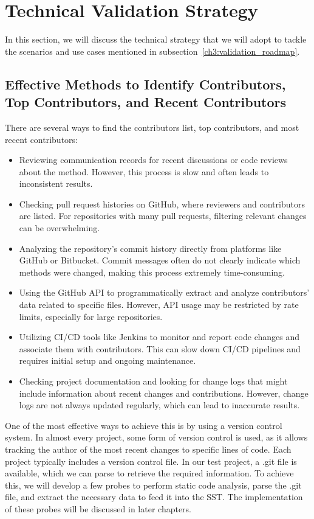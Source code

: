 \section{Technical Validation Strategy}

In this section, we will discuss the technical strategy that we will adopt to tackle the scenarios and use cases mentioned in subsection~\ref{ch3:validation_roadmap}.

\subsection{Effective Methods to Identify Contributors, Top Contributors, and Recent Contributors}

There are several ways to find the contributors list, top contributors, and most recent contributors:
\begin{itemize}
    \item Reviewing communication records for recent discussions or code reviews about the method. However, this process is slow and often leads to inconsistent results.
    \item Checking pull request histories on GitHub, where reviewers and contributors are listed. For repositories with many pull requests, filtering relevant changes can be overwhelming.
    \item Analyzing the repository's commit history directly from platforms like GitHub or Bitbucket. Commit messages often do not clearly indicate which methods were changed, making this process extremely time-consuming.
    \item Using the GitHub API to programmatically extract and analyze contributors' data related to specific files. However, API usage may be restricted by rate limits, especially for large repositories.
    \item Utilizing CI/CD tools like Jenkins to monitor and report code changes and associate them with contributors. This can slow down CI/CD pipelines and requires initial setup and ongoing maintenance.
    \item Checking project documentation and looking for change logs that might include information about recent changes and contributions. However, change logs are not always updated regularly, which can lead to inaccurate results.
\end{itemize}

One of the most effective ways to achieve this is by using a version control system. In almost every project, some form of version control is used, as it allows tracking the author of the most recent changes to specific lines of code. Each project typically includes a version control file. In our test project, a .git file is available, which we can parse to retrieve the required information. To achieve this, we will develop a few probes to perform static code analysis, parse the .git file, and extract the necessary data to feed it into the SST. The implementation of these probes will be discussed in later chapters.

